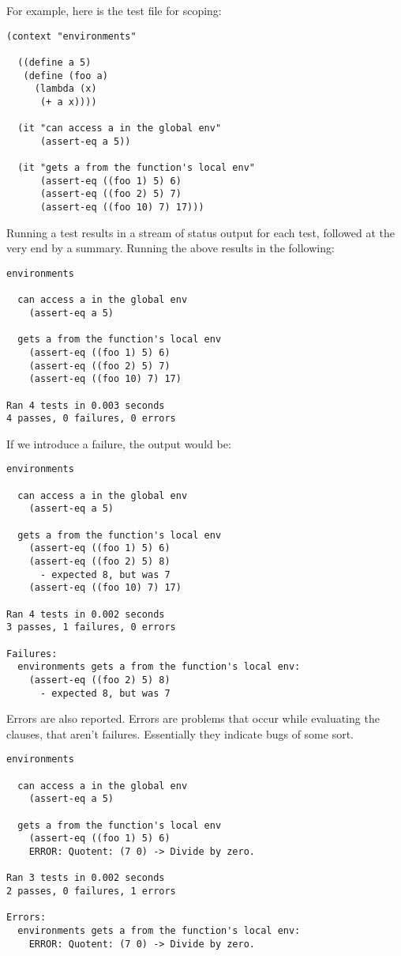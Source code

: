 \documentclass{article}
\begin{document}
For example, here is the test file for scoping:

\begin{verbatim}
(context "environments"

  ((define a 5)
   (define (foo a)
     (lambda (x)
      (+ a x))))

  (it "can access a in the global env"
      (assert-eq a 5))

  (it "gets a from the function's local env"
      (assert-eq ((foo 1) 5) 6)
      (assert-eq ((foo 2) 5) 7)
      (assert-eq ((foo 10) 7) 17)))
\end{verbatim}

Running a test results in a stream of status output for each test, followed at the very end by
a summary. Running the above results in the following:

\begin{verbatim}
environments

  can access a in the global env
    (assert-eq a 5)

  gets a from the function's local env
    (assert-eq ((foo 1) 5) 6)
    (assert-eq ((foo 2) 5) 7)
    (assert-eq ((foo 10) 7) 17)

Ran 4 tests in 0.003 seconds
4 passes, 0 failures, 0 errors
\end{verbatim}

If we introduce a failure, the output would be:

\begin{verbatim}
environments

  can access a in the global env
    (assert-eq a 5)

  gets a from the function's local env
    (assert-eq ((foo 1) 5) 6)
    (assert-eq ((foo 2) 5) 8)
      - expected 8, but was 7
    (assert-eq ((foo 10) 7) 17)

Ran 4 tests in 0.002 seconds
3 passes, 1 failures, 0 errors

Failures:
  environments gets a from the function's local env:
    (assert-eq ((foo 2) 5) 8)
      - expected 8, but was 7
\end{verbatim}

Errors are also reported. Errors are problems that occur while evaluating the clauses, that
aren't failures. Essentially they indicate bugs of some sort.

\begin{verbatim}
environments

  can access a in the global env
    (assert-eq a 5)

  gets a from the function's local env
    (assert-eq ((foo 1) 5) 6)
    ERROR: Quotent: (7 0) -> Divide by zero.

Ran 3 tests in 0.002 seconds
2 passes, 0 failures, 1 errors

Errors:
  environments gets a from the function's local env:
    ERROR: Quotent: (7 0) -> Divide by zero.
\end{verbatim}
\end{document}
